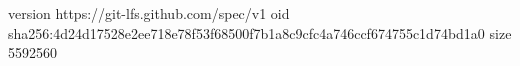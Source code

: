 version https://git-lfs.github.com/spec/v1
oid sha256:4d24d17528e2ee718e78f53f68500f7b1a8c9cfc4a746ccf674755c1d74bd1a0
size 5592560
